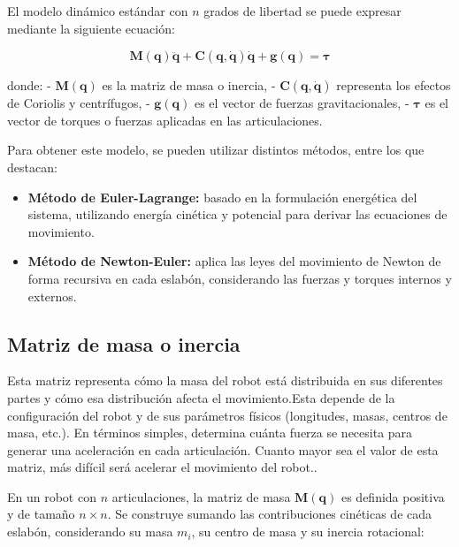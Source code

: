 El modelo dinámico estándar con \(n\) grados de libertad se puede expresar mediante la siguiente ecuación:

\begin{equation}
	\mathbf{M}(\mathbf{q}) \ddot{\mathbf{q}} + \mathbf{C}(\mathbf{q}, \dot{\mathbf{q}}) \dot{\mathbf{q}} + \mathbf{g}(\mathbf{q}) = \boldsymbol{\tau}
\end{equation}

donde:
- \(\mathbf{M}(\mathbf{q})\) es la matriz de masa o inercia,
- \(\mathbf{C}(\mathbf{q}, \dot{\mathbf{q}})\) representa los efectos de Coriolis y centrífugos,
- \(\mathbf{g}(\mathbf{q})\) es el vector de fuerzas gravitacionales,
- \(\boldsymbol{\tau}\) es el vector de torques o fuerzas aplicadas en las articulaciones.

Para obtener este modelo, se pueden utilizar distintos métodos, entre los que destacan:

\begin{itemize}
	\item \textbf{Método de Euler-Lagrange:} basado en la formulación energética del sistema, utilizando energía cinética y potencial para derivar las ecuaciones de movimiento.
	\item \textbf{Método de Newton-Euler:} aplica las leyes del movimiento de Newton de forma recursiva en cada eslabón, considerando las fuerzas y torques internos y externos.
\end{itemize}


\subsection{Matriz de masa o inercia}

Esta matriz representa cómo la masa del robot está distribuida en sus diferentes partes y cómo esa distribución afecta el movimiento.Esta depende de la configuración del robot y de sus parámetros físicos (longitudes, masas, centros de masa, etc.). En términos simples, determina cuánta fuerza se necesita para generar una aceleración en cada articulación. Cuanto mayor sea el valor de esta matriz, más difícil será acelerar el movimiento del robot.\cite{Barrientos_fundamentos_robotica}.

En un robot con \(n\) articulaciones, la matriz de masa \(\mathbf{M}(\mathbf{q})\) es definida positiva y de tamaño \(n \times n\). Se construye sumando las contribuciones cinéticas de cada eslabón, considerando su masa \(m_i\), su centro de masa y su inercia rotacional:

